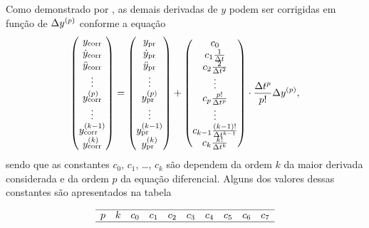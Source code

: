 Como demonstrado por , as demais derivadas de \(y\) podem ser corrigidas em função de \(\Delta \deriv{p}{y}\) conforme a equação
\begin{equation} \label{eq:correction}
	\begin{pmatrix}
		\corrected{\deriv{0}{y}} \\
		\corrected{\deriv{1}{y}} \\
		\corrected{\deriv{2}{y}} \\
		\vdots \\
		\corrected{\deriv{p}{y}} \\
		\vdots \\
		\corrected{\deriv{k-1}{y}} \\
		\corrected{\deriv{k}{y}}
	\end{pmatrix}
	=
	\begin{pmatrix}
		\predicted{\deriv{0}{y}} \\
		\predicted{\deriv{1}{y}} \\
		\predicted{\deriv{2}{y}} \\
		\vdots \\
		\predicted{\deriv{p}{y}} \\
		\vdots \\
		\predicted{\deriv{k-1}{y}} \\
		\predicted{\deriv{k}{y}}
	\end{pmatrix}
	+
	\begin{pmatrix}
		c_0 \\
		c_1\frac{1}{\Dt} \\
		c_2\frac{2}{\Dt^2} \\
		\vdots \\
		c_p\frac{p!}{\Dt^p}\\
		\vdots \\
		c_{k-1}\frac{\pqty{k-1}!}{\Dt^{k-1}}\\
		c_k\frac{k!}{\Dt^k}
	\end{pmatrix}
	\cdot
	\dfrac{\Dt^p}{p!}\Delta \deriv{p}{y},
\end{equation}
sendo que as constantes \(c_0\), \(c_1\), \dots, \(c_k\) são dependem da ordem \(k\) da maior derivada considerada e da ordem \(p\) da equação diferencial. Alguns dos valores dessas constantes são apresentados na tabela
	
\begin{table}[h]
\begin{equation*}
	\begin{array}{cccccccccc}
	\hline
	p & k & c_0 & c_1 & c_2 & c_3 & c_4 & c_5 & c_6 & c_7 \\

	\hline	
	\end{array}
\end{equation*}
\end{table}
